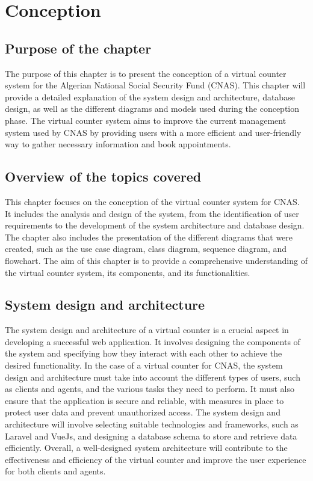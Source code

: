 \chapter{Conception}
\section{Purpose of the chapter}
The purpose of this chapter is to present the conception of a virtual counter system for the Algerian National Social Security Fund (CNAS). This chapter will provide a detailed explanation of the system design and architecture, database design, as well as the different diagrams and models used during the conception phase. The virtual counter system aims to improve the current management system used by CNAS by providing users with a more efficient and user-friendly way to gather necessary information and book appointments.
\section {Overview of the topics covered}
This chapter focuses on the conception of the virtual counter system for CNAS. It includes the analysis and design of the system, from the identification of user requirements to the development of the system architecture and database design. The chapter also includes the presentation of the different diagrams that were created, such as the use case diagram, class diagram, sequence diagram, and flowchart.
The aim of this chapter is to provide a comprehensive understanding of the virtual counter system, its components, and its functionalities.

\section{System design and architecture}
The system design and architecture of a virtual counter is a crucial aspect in developing a successful web application. It involves designing the components of the system and specifying how they interact with each other to achieve the desired functionality. In the case of a virtual counter for CNAS, the system design and architecture must take into account the different types of users, such as clients and agents, and the various tasks they need to perform. It must also ensure that the application is secure and reliable, with measures in place to protect user data and prevent unauthorized access. The system design and architecture will involve selecting suitable technologies and frameworks, such as Laravel and VueJs, and designing a database schema to store and retrieve data efficiently. Overall, a well-designed system architecture will contribute to the effectiveness and efficiency of the virtual counter and improve the user experience for both clients and agents.

